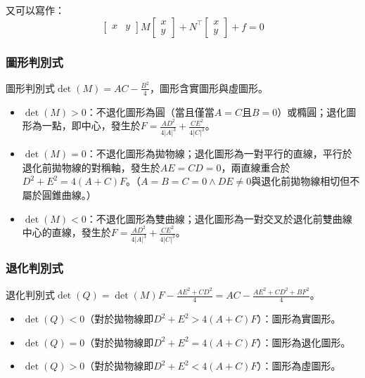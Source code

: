 \documentclass[a4paper,12pt]{article}
\begin{document}
又可以寫作：
\[\begin{bmatrix} x & y \end{bmatrix}
M\begin{bmatrix} x \\ y\end{bmatrix} + N^{\top}\begin{bmatrix} x \\ y\end{bmatrix} + f = 0\]
\subsubsection{圖形判別式}
圖形判別式$\det(M)=AC-\frac{B^2}{4}$，圖形含實圖形與虛圖形。
\begin{itemize}
\item $\det(M)>0$：不退化圖形為圓（當且僅當$A=C$且$B=0$）或橢圓；退化圖形為一點，即中心，發生於$F=\frac{AD^2}{4|A|^3}+\frac{CE^2}{4|C|^3}$。
\item $\det(M)=0$：不退化圖形為拋物線；退化圖形為一對平行的直線，平行於退化前拋物線的對稱軸，發生於$AE=CD=0$，兩直線重合於$D^2+E^2=4(A+C)F$。（$A=B=C=0\land DE\neq 0$與退化前拋物線相切但不屬於圓錐曲線。）
\item $\det(M)<0$：不退化圖形為雙曲線；退化圖形為一對交叉於退化前雙曲線中心的直線，發生於$F=\frac{AD^2}{4|A|^3}+\frac{CE^2}{4|C|^3}$。
\end{itemize}
\subsubsection{退化判別式}
退化判別式$\det(Q)=\det(M)F-\frac{AE^2+CD^2}{4}=AC-\frac{AE^2+CD^2+BF^2}{4}$。
\begin{itemize}
\item $\det(Q)<0$（對於拋物線即$D^2+E^2>4(A+C)F$）：圖形為實圖形。
\item $\det(Q)=0$（對於拋物線即$D^2+E^2=4(A+C)F$）：圖形為退化圖形。
\item $\det(Q)>0$（對於拋物線即$D^2+E^2<4(A+C)F$）：圖形為虛圖形。
\end{itemize}
\end{document}
